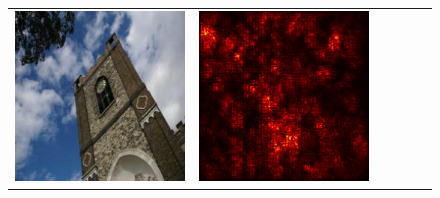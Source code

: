 \documentclass[preprint,12pt]{elsarticle}
\begin{document}
\begin{figure}[p]
\begin{tabular}{cccccc}
  \includegraphics[scale=\scale]{../visualizations/examples/imagenette/cnn/images/6.png} &
  \includegraphics[scale=\scale]{../visualizations/examples/imagenette/cnn/saliency_map/6.png} & 

\end{tabular}
\end{figure}
\end{document}
